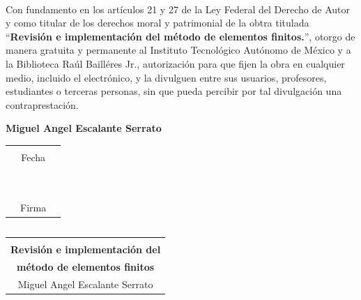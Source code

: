 \documentclass[12pt,spanish,oneside]{book}
\theoremstyle{plain}
\numberwithin{equation}{chapter}
\theoremstyle{definition}
\theoremstyle{remark}
\begin{document}
\newpage
\setcounter{page}{1}
\mbox{ }
\vspace{80pt}
\mbox{ }

Con fundamento en los artículos 21 y 27 de la Ley Federal del Derecho de Autor y como titular de los derechos moral y patrimonial de la obtra titulada ``\textbf{Revisión e implementación del método de elementos finitos.}'', otorgo de manera gratuita y permanente al Instituto Tecnológico Autónomo de México y a la Biblioteca Raúl Bailléres Jr., autorización para que fijen la obra en cualquier medio, incluido el electrónico, y la divulguen entre sus usuarios, profesores, estudiantes o terceras personas, sin que pueda percibir por tal divulgación una contraprestación.
\vspace{20pt}
\begin{center}
\textbf{Miguel Angel Escalante Serrato}
\vspace{80pt}

\begin{tabular}{p{2cm}cp{2cm}}

\hline \\
 

&Fecha & \\
\\
\\
\\
\\
\\
\\
\\
\\
\hline \\

 & Firma & 

\end{tabular}
\end{center}



\newpage
\thispagestyle{empty}

\begin{center}

\vspace{40pt}
\[\]
\[\]
\[\]
\begin{tabular}{c}
\hline
 \\[.2cm]
\Huge
\textbf{Revisión e implementación del }\\ 
\Huge\textbf{método de elementos finitos }\\[14pt]
\normalsize
Miguel Angel Escalante Serrato \\[.2cm]

\hline
\end{tabular}
\end{center}
\end{document}
